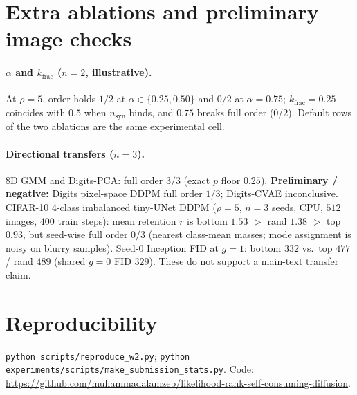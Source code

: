 \documentclass[11pt]{article}
\begin{document}



\appendix
\section{Extra ablations and preliminary image checks}
\label{app:extra}
\paragraph{$\alpha$ and $k_{\mathrm{frac}}$ ($n{=}2$, illustrative).}
At $\rho{=}5$, order holds $1/2$ at $\alpha\in\{0.25,0.50\}$ and $0/2$ at $\alpha{=}0.75$; $k_{\mathrm{frac}}{=}0.25$ coincides with $0.5$ when $n_{\mathrm{syn}}$ binds, and $0.75$ breaks full order ($0/2$).
Default rows of the two ablations are the same experimental cell.

\paragraph{Directional transfers ($n{=}3$).}
$8$D GMM and Digits-PCA: full order $3/3$ (exact $p$ floor $0.25$).
\textbf{Preliminary / negative:} Digits pixel-space DDPM full order $1/3$; Digits-CVAE inconclusive.
CIFAR-10 4-class imbalanced tiny-UNet DDPM ($\rho{=}5$, $n{=}3$ seeds, CPU, $512$ images, $400$ train steps): mean retention $\bar r$ is bottom $1.53$ $>$ rand $1.38$ $>$ top $0.93$, but seed-wise full order $0/3$ (nearest class-mean masses; mode assignment is noisy on blurry samples).
Seed-$0$ Inception FID at $g{=}1$: bottom $332$ vs.\ top $477$ / rand $489$ (shared $g{=}0$ FID $329$).
These do not support a main-text transfer claim.

\section{Reproducibility}
\texttt{python scripts/reproduce\_w2.py}; \texttt{python experiments/scripts/make\_submission\_stats.py}.
Code: \url{https://github.com/muhammadalamzeb/likelihood-rank-self-consuming-diffusion}.
\end{document}
